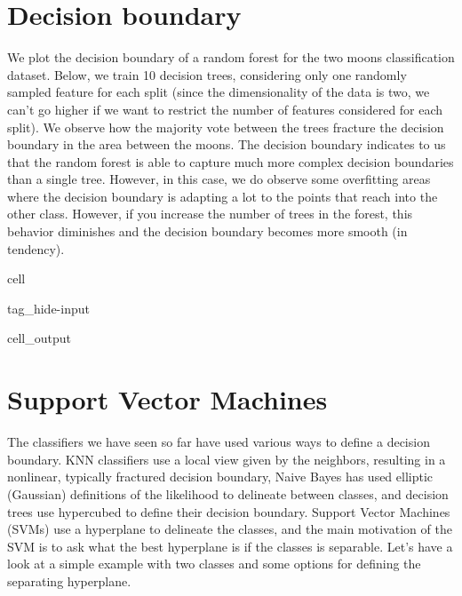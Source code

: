 \documentclass[letterpaper,10pt,english]{jupyterBook}
\begin{document}
\section{Decision boundary}
\label{\detokenize{classification_random_forests:decision-boundary}}
\sphinxAtStartPar
We plot the decision boundary of a random forest for the two moons classification dataset. Below, we train 10 decision trees, considering only one randomly sampled feature for each split (since the dimensionality of the data is two, we can’t go higher if we want to restrict the number of features considered for each split).  We observe how the majority vote between the trees fracture the decision boundary in the area between the moons. The decision boundary indicates to us that the random forest is able to capture much more complex decision boundaries than a single tree. However, in this case, we do observe some overfitting areas where the decision boundary is adapting a lot to the points that reach into the other class. However, if you increase the number of trees in the forest, this behavior diminishes and the decision boundary becomes more smooth (in tendency).

\begin{sphinxuseclass}{cell}
\begin{sphinxuseclass}{tag_hide-input}\begin{sphinxVerbatimOutput}

\begin{sphinxuseclass}{cell_output}
\noindent{}

\end{sphinxuseclass}\end{sphinxVerbatimOutput}

\end{sphinxuseclass}
\end{sphinxuseclass}
\sphinxstepscope


\section{Support Vector Machines}
\label{\detokenize{classification_svms:support-vector-machines}}\label{\detokenize{classification_svms::doc}}
\sphinxAtStartPar
The classifiers we have seen so far have used various ways to define a decision boundary. KNN classifiers use a local view given by the neighbors, resulting in a nonlinear, typically fractured decision boundary, Naive Bayes has used elliptic (Gaussian) definitions of the likelihood to delineate between classes, and decision trees use hypercubed to define their decision boundary. Support Vector Machines (SVMs) use a hyperplane to delineate the classes, and the main motivation of the SVM is to ask what the best hyperplane is if the classes is separable. Let’s have a look at a simple example with two classes and some options for defining the separating hyperplane.
\end{document}
